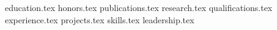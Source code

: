 \documentclass[11pt, letterpaper]{awesome-cv}
\newcommand*{\sectiondir}{sections}
\begin{document}
\makecvheader[C]

%
{education.tex}
{honors.tex}
{publications.tex}
{research.tex}
{qualifications.tex}
{experience.tex}
{projects.tex}
{skills.tex}
\newpage
{leadership.tex}
\end{document}
